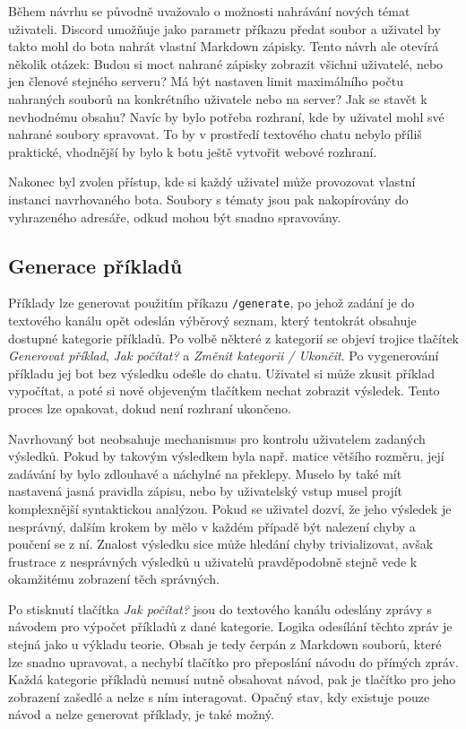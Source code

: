 \documentclass[FM]{tulthesis}
\begin{document}
	Během návrhu se původně uvažovalo o možnosti nahrávání nových témat uživateli. Discord umožňuje jako parametr příkazu předat soubor a uživatel by takto mohl do bota nahrát vlastní Markdown zápisky. Tento návrh ale otevírá několik otázek: Budou si moct nahrané zápisky zobrazit všichni uživatelé, nebo jen členové stejného serveru? Má být nastaven limit maximálního počtu nahraných souborů na konkrétního uživatele nebo na server? Jak se stavět k nevhodnému obsahu? Navíc by bylo potřeba rozhraní, kde by uživatel mohl své nahrané soubory spravovat. To by v prostředí textového chatu nebylo příliš praktické, vhodnější by bylo k botu ještě vytvořit webové rozhraní.
	
	Nakonec byl zvolen přístup, kde si každý uživatel může provozovat vlastní instanci navrhovaného bota. Soubory s tématy jsou pak nakopírovány do vyhrazeného adresáře, odkud mohou být snadno spravovány.
	
	\subsection{Generace příkladů}
	
	Příklady lze generovat použitím příkazu \verb|/generate|, po jehož zadání je do textového kanálu opět odeslán výběrový seznam, který tentokrát obsahuje dostupné kategorie příkladů. Po volbě některé z kategorií se objeví trojice tlačítek \textit{Generovat příklad}, \textit{Jak počítat?} a \textit{Změnit kategorii / Ukončit}. Po vygenerování příkladu jej bot bez výsledku odešle do chatu. Uživatel si může zkusit příklad vypočítat, a poté si nově objeveným tlačítkem nechat zobrazit výsledek. Tento proces lze opakovat, dokud není rozhraní ukončeno.
	
	Navrhovaný bot neobsahuje mechanismus pro kontrolu uživatelem zadaných výsledků. Pokud by takovým výsledkem byla např. matice většího rozměru, její zadávání by bylo zdlouhavé a náchylné na překlepy. Muselo by také mít nastavená jasná pravidla zápisu, nebo by uživatelský vstup musel projít komplexnější syntaktickou analýzou. Pokud se uživatel dozví, že jeho výsledek je nesprávný, dalším krokem by mělo v každém případě být nalezení chyby a poučení se z ní. Znalost výsledku sice může hledání chyby trivializovat, avšak frustrace z nesprávných výsledků u uživatelů pravděpodobně stejně vede k okamžitému zobrazení těch správných.
	
	Po stisknutí tlačítka \textit{Jak počítat?} jsou do textového kanálu odeslány zprávy s návodem pro výpočet příkladů z dané kategorie. Logika odesílání těchto zpráv je stejná jako u výkladu teorie. Obsah je tedy čerpán z Markdown souborů, které lze snadno upravovat, a nechybí tlačítko pro přeposlání návodu do přímých zpráv. Každá kategorie příkladů nemusí nutně obsahovat návod, pak je tlačítko pro jeho zobrazení zašedlé a nelze s ním interagovat. Opačný stav, kdy existuje pouze návod a nelze generovat příklady, je také možný.
	
\end{document}
